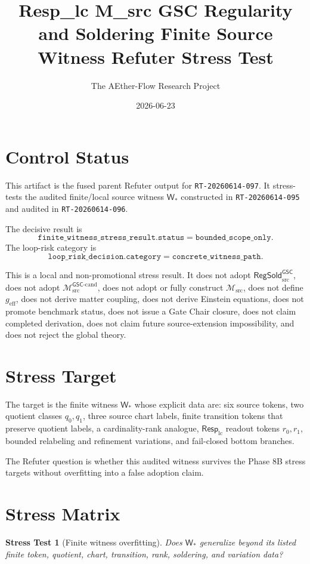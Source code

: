 \documentclass[11pt]{article}
\title{Resp\_lc M\_src GSC Regularity and Soldering Finite Source Witness Refuter Stress Test}
\author{The AEther-Flow Research Project}
\date{2026-06-23}
\newcommand{\RespLC}{\mathsf{Resp}_{\mathrm{lc}}}
\newcommand{\Msrc}{\mathcal{M}_{\mathrm{src}}}
\newcommand{\Mgsccand}{\mathcal{M}_{\mathrm{src}}^{\mathsf{GSC}\text{-}\mathrm{cand}}}
\newcommand{\geff}{g_{\mathrm{eff}}}
\newcommand{\RegSold}{\mathsf{RegSold}_{\mathrm{src}}^{\mathsf{GSC}}}
\newtheorem{stress}{Stress Test}
\begin{document}
\maketitle

\section*{Control Status}

This artifact is the fused parent Refuter output for
\texttt{RT-20260614-097}. It stress-tests the audited finite/local source
witness \(\mathsf{W}_*\) constructed in \texttt{RT-20260614-095} and audited
in \texttt{RT-20260614-096}.

The decisive result is
\[
  \texttt{finite\_witness\_stress\_result.status}
  =
  \texttt{bounded\_scope\_only}.
\]
The loop-risk category is
\[
  \texttt{loop\_risk\_decision.category}
  =
  \texttt{concrete\_witness\_path}.
\]

This is a local and non-promotional stress result. It does not adopt
\(\RegSold\), does not adopt \(\Mgsccand\), does not adopt or fully construct
\(\Msrc\), does not define \(\geff\), does not derive matter coupling, does
not derive Einstein equations, does not promote benchmark status, does not
issue a Gate Chair closure, does not claim completed derivation, does not
claim future source-extension impossibility, and does not reject the global
theory.

\section{Stress Target}

The target is the finite witness \(\mathsf{W}_*\) whose explicit data are:
six source tokens, two quotient classes \(q_0,q_1\), three source chart labels,
finite transition tokens that preserve quotient labels, a cardinality-rank
analogue, \(\RespLC\) readout tokens \(r_0,r_1\), bounded relabeling and
refinement variations, and fail-closed bottom branches.

The Refuter question is whether this audited witness survives the Phase 8B
stress targets without overfitting into a false adoption claim.

\section{Stress Matrix}

\begin{stress}[Finite witness overfitting]
Does \(\mathsf{W}_*\) generalize beyond its listed finite token, quotient,
chart, transition, rank, soldering, and variation data?
\end{stress}
\end{document}
